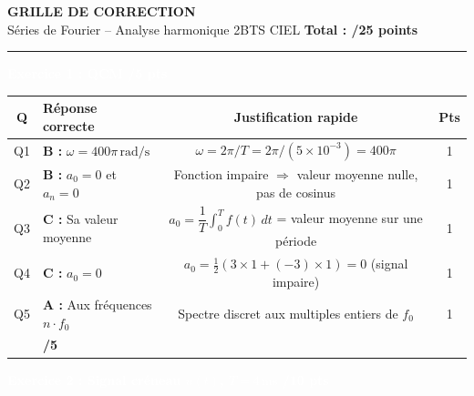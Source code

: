 \documentclass[10pt,a4paper]{article}
\renewcommand{\arraystretch}{1.35}
\newcommand{\exotitle}[2]{%
  \noindent\colorbox{exoheader}{%
    \parbox{\dimexpr\linewidth-2\fboxsep\relax}{%
      \textcolor{white}{\textbf{\large #1 \hfill #2}}%
    }%
  }%
}
\newcommand{\qcmtitle}[2]{%
  \noindent\colorbox{qcmheader}{%
    \parbox{\dimexpr\linewidth-2\fboxsep\relax}{%
      \textcolor{white}{\textbf{\large #1 \hfill #2}}%
    }%
  }%
}
\begin{document}
\begin{center}
  {\LARGE\textbf{GRILLE DE CORRECTION}}\\[8mm]
  {\large Séries de Fourier -- Analyse harmonique \hspace{1cm} 2BTS CIEL \hspace{1cm} \textbf{Total : /25 points}}
\end{center}

\vspace{2mm}

\hrule

\vspace{8mm}

\qcmtitle{Exercice 1 : QCM}{/5 pts}

\vspace{1mm}

\begin{tabularx}{\linewidth}{|c|X|c|c|}
  \hline
  \rowcolor{qcmlight}
  \textbf{Q} & \textbf{Réponse correcte} & \textbf{Justification rapide} & \textbf{Pts} \\
  \hline
  Q1 & \textbf{B :} $\omega = 400\pi\,\mathrm{rad/s}$
     & $\omega = 2\pi/T = 2\pi/(5\times10^{-3}) = 400\pi$
     & 1 \\
  \hline
  Q2 & \textbf{B :} $a_0 = 0$ et $a_n = 0$
     & Fonction impaire $\Rightarrow$ valeur moyenne nulle, pas de cosinus
     & 1 \\
  \hline
  Q3 & \textbf{C :} Sa valeur moyenne
     & $a_0 = \dfrac{1}{T}\int_0^T f(t)\,dt$ = valeur moyenne sur une période
     & 1 \\
  \hline
  Q4 & \textbf{C :} $a_0 = 0$
     & $a_0 = \frac{1}{2}(3\times1 + (-3)\times1) = 0$ \quad (signal impaire)
     & 1 \\
  \hline
  Q5 & \textbf{A :} Aux fréquences $n\cdot f_0$
     & Spectre discret aux multiples entiers de $f_0$
     & 1 \\
  \hline
  \rowcolor{totalrow}
  \multicolumn{3}{|r|}{\textbf{Sous-total Exercice 1}} & \textbf{/5} \\
  \hline
\end{tabularx}

\vfill 

\exotitle{Exercice 2 : Signal créneau $u(t)$, $T = 4\,\mathrm{ms}$}{/10 pts}

\vspace{1mm}

\renewcommand{\arraystretch}{2}
\end{document}
